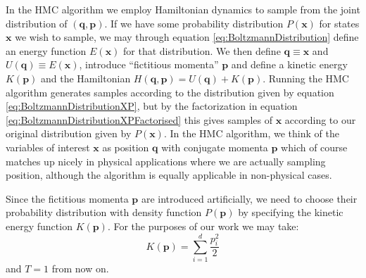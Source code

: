 \documentclass[12pt]{article}
\begin{document}
            In the HMC algorithm we employ Hamiltonian dynamics to sample from the joint distribution of $\left(\bm{q},\bm{p}\right)$. If we have some probability distribution $P\left(\bm{x}\right)$ for states $\bm{x}$ we wish to sample, we may through equation \ref{eq:BoltzmannDistribution} define an energy function $E\left(\bm{x}\right)$ for that distribution. We then define $\bm{q}\equiv\bm{x}$ and $U\left(\bm{q}\right) \equiv E\left(\bm{x}\right)$, introduce ``fictitious momenta'' $\bm{p}$ and define a kinetic energy $K\left(\bm{p}\right)$ and the Hamiltonian $H\left(\bm{q},\bm{p}\right) = U\left(\bm{q}\right) + K\left(\bm{p}\right)$. Running the HMC algorithm generates samples according to the distribution given by equation \ref{eq:BoltzmannDistributionXP}, but by the factorization in equation \ref{eq:BoltzmannDistributionXPFactorised} this gives samples of $\bm{x}$ according to our original distribution given by $P\left(\bm{x}\right)$. In the HMC algorithm, we think of the variables of interest $\bm{x}$ as position $\bm{q}$ with conjugate momenta $\bm{p}$ which of course matches up nicely in physical applications where we are actually sampling position, although the algorithm is equally applicable in non-physical cases.

            Since the fictitious momenta $\bm{p}$ are introduced artificially, we need to choose their probability distribution with density function $P\left(\bm{p}\right)$ by specifying the kinetic energy function $K\left(\bm{p}\right)$. For the purposes of our work we may take:
            \begin{equation}
                \label{eq:HMCQuadraticKineticEnergy}
                K\left(\bm{p}\right) = \sum_{i=1}^{d}\frac{p_i^2}{2}
            \end{equation}
            and $T=1$ from now on.
\end{document}
